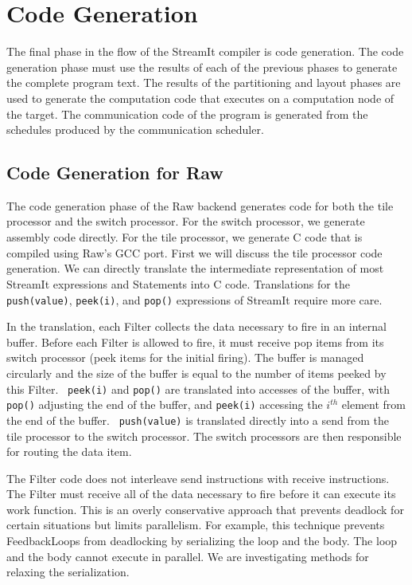 \section{Code Generation}
\label{sec:codegen}

The final phase in the flow of the StreamIt compiler is code
generation.  The code generation phase must use the results of each of
the previous phases to generate the complete program text.  The
results of the partitioning and layout phases are used to generate the
computation code that executes on a computation node of the target.
The communication code of the program is generated from the schedules
produced by the communication scheduler.


\subsection{Code Generation for Raw}

The code generation phase of the Raw backend generates code for both
the tile processor and the switch processor.  For the switch
processor, we generate assembly code directly.  For the tile
processor, we generate C code that is compiled using Raw's GCC port.
First we will discuss the tile processor code generation.  We can
directly translate the intermediate representation of most StreamIt
expressions and Statements into C code.  Translations for the {\tt
push(value)}, {\tt peek(i)}, and {\tt pop()} expressions of StreamIt
require more care.


In the translation, each Filter collects the data necessary to fire in
an internal buffer.  Before each Filter is allowed to fire, it must
receive pop items from its switch processor (peek items for the
initial firing).  The buffer is managed circularly and the size of the
buffer is equal to the number of items peeked by this Filter.  {\tt
peek(i)} and {\tt pop()} are translated into accesses of the buffer,
with {\tt pop()} adjusting the end of the buffer, and {\tt peek(i)}
accessing the $i^{th}$ element from the end of the buffer.  {\tt
push(value)} is translated directly into a send from the tile
processor to the switch processor.  The switch processors are then
responsible for routing the data item.

The Filter code does not interleave send instructions with receive
instructions.  The Filter must receive all of the data necessary to
fire before it can execute its work function.  This is an overly
conservative approach that prevents deadlock for certain situations
but limits parallelism.  For example, this technique prevents
FeedbackLoops from deadlocking by serializing the loop and the body.  
The loop and the body cannot execute in parallel.  We are
investigating methods for relaxing the serialization.

